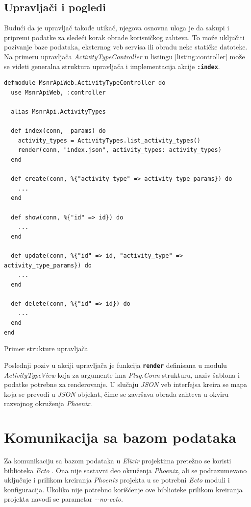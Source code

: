 \documentclass[12pt,oneside]{memoir}
\begin{document}
\subsection{Upravljači i pogledi}
Budući da je upravljač takođe utikač, njegova osnovna uloga je da sakupi i pripremi podatke za sledeći korak obrade korisničkog zahteva.
To može uključiti pozivanje baze podataka, eksternog veb servisa ili obradu neke statičke datoteke. 
Na primeru upravljača \emph{ActivityTypeController} u listingu \ref{listing:controller} može se videti generalna struktura upravljača
i implementacija akcije \texttt{\textbf{:index}}.
\begin{listing}[!h]
\begin{verbatim}
defmodule MsnrApiWeb.ActivityTypeController do
  use MsnrApiWeb, :controller

  alias MsnrApi.ActivityTypes

  def index(conn, _params) do
    activity_types = ActivityTypes.list_activity_types()
    render(conn, "index.json", activity_types: activity_types)
  end

  def create(conn, %{"activity_type" => activity_type_params}) do
    ...
  end

  def show(conn, %{"id" => id}) do
    ...
  end

  def update(conn, %{"id" => id, "activity_type" => activity_type_params}) do
    ...
  end

  def delete(conn, %{"id" => id}) do
    ...
  end
end
\end{verbatim}
\caption{Primer strukture upravljača}
\label{listing:controller}
\end{listing}

Poslednji poziv u akciji upravljača je funkcija \texttt{\textbf{render}} definisana u modulu \emph{ActivityTypeView} koja za argumente ima \emph{Plug.Conn} strukturu,
naziv šablona i podatke potrebne za renderovanje. U slučaju \emph{JSON} veb interfejsa kreira se mapa koja se prevodi u \emph{JSON} objekat,
čime se završava obrada zahteva u okviru razvojnog okruženja \emph{Phoenix}. 

\section{Komunikacija sa bazom podataka}
Za komunikaciju sa bazom podataka u \emph{Elixir} projektima pretežno se koristi biblioteka \emph{Ecto} \cite{ecto}.
Ona nije sastavni deo okruženja \emph{Phoenix}, ali se podrazumevano uključuje i prilikom kreiranja
\emph{Phoenix} projekta u se potrebni \emph{Ecto} moduli i konfiguracija. Ukoliko nije potrebno
korišćenje ove biblioteke prilikom kreiranja projekta navodi se parametar \emph{-{}-no-ecto}.
\end{document}
